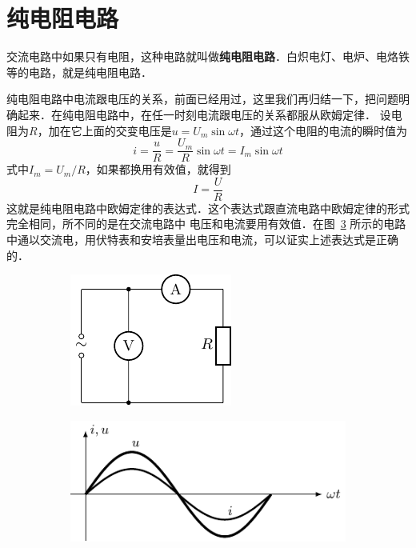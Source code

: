 \section{纯电阻电路}
交流电路中如果只有电阻，这种电路就叫做\textbf{纯电阻电路}．白炽电灯、电炉、电烙铁等的电路，就是纯电阻电路．

纯电阻电路中电流跟电压的关系，前面已经用过，这里我们再归结一下，把问题明确起来．在纯电阻电路中，在任一时刻电流跟电压的关系都服从欧姆定律．
设电阻为$R$，加在它上面的交变电压是$u=U_m\sin \omega t$，通过这个电阻的电流的瞬时值为
\[i=\frac{u}{R}=\frac{U_m}{R}\sin\omega t=I_m\sin\omega t\]
式中$I_m=U_m/R$，如果都换用有效值，就得到
\begin{equation}\label{eq_C_3-7}
    I=\frac{U}{R}
\end{equation}
这就是纯电阻电路中欧姆定律的表达式．这个表达式跟直流电路中欧姆定律的形式完全相同，所不同的是在交流电路中
电压和电流要用有效值．在图~\ref{fig_C_3-11} 所示的电路中通以交流电，用伏特表和安培表量出电压和电流，可以证实上述表达式是正确的．
\begin{figure}[htbp]
    \centering
    \begin{subfigure}{0.4\linewidth}
        \centering
        \includegraphics{fig/C/3-11a.pdf}
        \caption{}\label{fig_C_3-11a}
    \end{subfigure}
    \hfil
    \begin{subfigure}{0.4\linewidth}
        \centering
        \includegraphics{fig/C/3-11b.pdf}
        \caption{}\label{fig_C_3-11b}
    \end{subfigure}
    \caption{}\label{fig_C_3-11}
\end{figure}

